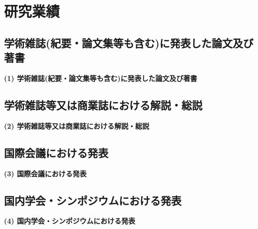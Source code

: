 \section{研究業績}





\vspace*{152pt}

{%
}%

\subsection{学術雑誌(紀要・論文集等も含む)に発表した論文及び著書}
	\noindent
	{\bf (1) 学術雑誌(紀要・論文集等も含む)に発表した論文及び著書}
{%
}%

\subsection{学術雑誌等又は商業誌における解説・総説}
	\noindent
	{\bf (2) 学術雑誌等又は商業誌における解説・総説}
{%
}%

\subsection{国際会議における発表}
	\noindent
	{\bf (3) 国際会議における発表}
{%
}%

\subsection{国内学会・シンポジウムにおける発表}
	\noindent
	{\bf (4) 国内学会・シンポジウムにおける発表}
{%
}%

